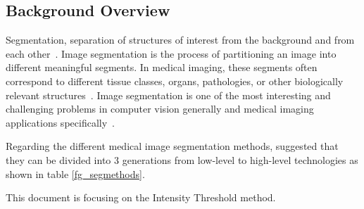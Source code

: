 \documentclass[12pt]{article}
\begin{document}
\subsection{Background Overview} \label{sec_Background}
Segmentation, separation of structures of interest from the background and from each other~\cite{Bankman2000}. Image segmentation is the process of partitioning an image into different meaningful segments. In medical imaging, these segments often correspond to different tissue classes, organs, pathologies, or other biologically relevant structures~\cite{Forouzanfar2010}. Image segmentation is one of the most interesting and challenging problems in computer vision generally and medical imaging applications specifically~\cite{Elnakib2011}.

Regarding the different medical image segmentation methods, \cite{Withey2007} suggested that they can be divided into 3 generations from low-level to high-level technologies as shown in table \ref{fg_segmethods}.

This document is focusing on the Intensity Threshold method.
\end{document}

